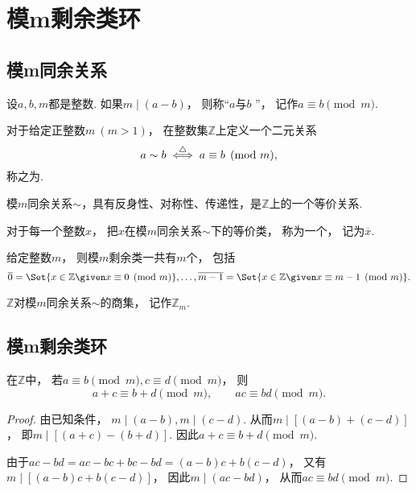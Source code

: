 \section{模m剩余类环}
\subsection{模m同余关系}
\begin{definition}
设\(a,b,m\)都是整数.
如果\(m\mid(a-b)\)，
则称“\(a\)与\(b\) ”，
记作\(a\equiv b\pmod m\).
\end{definition}
\begin{definition}
对于给定正整数\(m\ (m>1)\)，
在整数集\(\mathbb{Z}\)上定义一个二元关系\begin{equation*}
	a \sim b
	\overset{\triangle}{\iff}
	a\equiv b\pmod m,
\end{equation*}
称之为.
\end{definition}
\begin{theorem}
模\(m\)同余关系\(\sim\)，具有反身性、对称性、传递性，是\(\mathbb{Z}\)上的一个等价关系.
\end{theorem}
\begin{definition}
对于每一个整数\(x\)，
把\(x\)在模\(m\)同余关系\(\sim\)下的等价类，
称为一个，
记为\(\overline{x}\).
\end{definition}
\begin{proposition}
给定整数\(m\)，
则模\(m\)剩余类一共有\(m\)个，
包括\begin{equation*}
	\overline{0}
	= \Set{ x\in\mathbb{Z} \given x\equiv0\pmod m },
	\dotsc,
	\overline{m-1}
	= \Set{ x\in\mathbb{Z} \given x\equiv m-1\pmod m }.
\end{equation*}
\end{proposition}
\begin{definition}
\(\mathbb{Z}\)对模\(m\)同余关系\(\sim\)的商集，
记作\(\mathbb{Z}_m\).
\end{definition}

\subsection{模m剩余类环}
\begin{proposition}
在\(\mathbb{Z}\)中，
若\(a\equiv b\pmod m,
c\equiv d\pmod m\)，
则\begin{equation*}
	a+c\equiv b+d\pmod m, \qquad
	ac\equiv bd\pmod m.
\end{equation*}
\begin{proof}
由已知条件，
\(m\mid(a-b),
m\mid(c-d)\).
从而\(m\mid[(a-b)+(c-d)]\)，
即\(m\mid[(a+c)-(b+d)]\).
因此\(a+c\equiv b+d\pmod m\).

由于\(ac-bd
=ac-bc+bc-bd
=(a-b)c+b(c-d)\)，
又有\(m\mid[(a-b)c+b(c-d)]\)，
因此\(m\mid(ac-bd)\)，
从而\(ac\equiv bd\pmod m\).
\end{proof}
\end{proposition}

